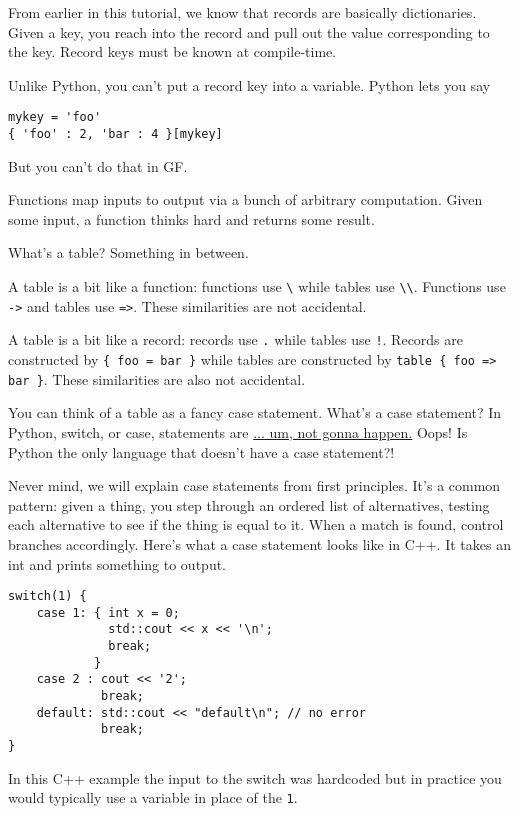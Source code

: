 \documentclass{scrartcl}
\begin{document}
From earlier in this tutorial, we know that records are basically dictionaries. Given a key, you reach into the record and pull out the value corresponding to the key. Record keys must be known at compile-time.

Unlike Python, you can't put a record key into a variable. Python lets you say

\begin{verbatim}
mykey = 'foo'
{ 'foo' : 2, 'bar : 4 }[mykey]
\end{verbatim}

But you can't do that in GF.

Functions map inputs to output via a bunch of arbitrary computation. Given some input, a function thinks hard and returns some result.

What's a table? Something in between.

A table is a bit like a function: functions use \texttt{\textbackslash} while tables use \texttt{\textbackslash\textbackslash}. Functions use \texttt{->} and tables use \texttt{=>}. These similarities are not accidental.

A table is a bit like a record: records use \texttt{.} while tables use \texttt{!}. Records are constructed by \texttt{\{ foo = bar \}} while tables are constructed by \texttt{table \{ foo => bar \}}. These similarities are also not accidental.

You can think of a table as a fancy case statement. What's a case statement? In Python, switch, or case, statements are \href{https://www.python.org/dev/peps/pep-3103/}{... um, not gonna happen.} Oops! Is Python the only language that doesn't have a case statement?!

Never mind, we will explain case statements from first principles. It's a common pattern: given a thing, you step through an ordered list of alternatives, testing each alternative to see if the thing is equal to it. When a match is found, control branches accordingly. Here's what a case statement looks like in C++. It takes an int and prints something to output.

\begin{verbatim}
switch(1) {
    case 1: { int x = 0;
              std::cout << x << '\n';
              break;
            }
    case 2 : cout << '2';
             break;
    default: std::cout << "default\n"; // no error
             break;
}
\end{verbatim}

In this C++ example the input to the switch was hardcoded but in practice you would typically use a variable in place of the \texttt{1}.
\end{document}
